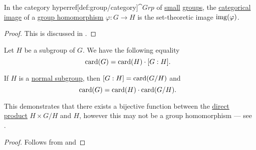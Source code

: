 \begin{proposition}\label{thm:cokernels_in_grp}
  In the category hyperref[def:group/category]{\( \cat{Grp} \)} of \hyperref[def:category_size]{small} \hyperref[def:group]{groups}, the \hyperref[def:zero_morphisms/image]{categorical image} of a \hyperref[def:group/homomorphism]{group homomorphism} \( \varphi: G \to H \) is the set-theoretic image \( \operatorname{img}(\varphi) \).
\end{proposition}
\begin{proof}
  This is discussed in .
\end{proof}

\begin{theorem}\label{thm:lagranges_theorem_for_groups}
  Let \( H \) be a subgroup of \( G \). We have the following equality
  \begin{equation}\label{eq:thm:lagranges_theorem_for_groups/index}
    \operatorname{card}(G) = \operatorname{card}(H) \cdot [G : H].
  \end{equation}

  If \( H \) is a \hyperref[def:normal_subgroup]{normal subgroup}, then \( [G : H] = \operatorname{card}(G / H) \) and
  \begin{equation}\label{eq:thm:lagranges_theorem_for_groups/card}
    \operatorname{card}(G) = \operatorname{card}(H) \cdot \operatorname{card}(G / H).
  \end{equation}

  This demonstrates that there exists a bijective function between the \hyperref[def:group_direct_product]{direct product} \( H \times G / H \) and \( H \), however this may not be a group homomorphism --- see .
\end{theorem}
\begin{proof}
  Follows from  and 
\end{proof}

